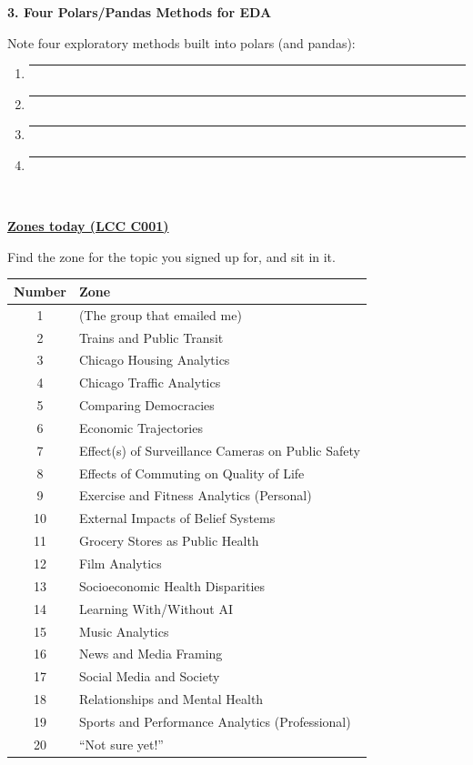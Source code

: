 \documentclass[11pt]{article}
\newcommand{\blankspace}[1]{%
  \vspace{0.3em}
  \begin{minipage}[t][#1][t]{\linewidth}
  \end{minipage}
  \vspace{0.3em}
}
\newcommand{\guidedopen}[4]{%
  \noindent\textbf{#1}\\[0.18em]
  \noindent
  \begin{minipage}[t]{0.485\textwidth}
    #2
    \blankspace{#3}
  \end{minipage}
  \hfill
  \begin{minipage}[t]{0.485\textwidth}
    \blankspace{#4}
  \end{minipage}
  \\[0.4em]
}
\begin{document}
\vfill

\guidedopen{3. Four Polars/Pandas Methods for EDA}{
Note four exploratory methods built into polars (and pandas):
\begin{enumerate}[itemsep=0.2em]
  \item \rule{\linewidth}{0.4pt}%
  \item \rule{\linewidth}{0.4pt}%
  \item \rule{\linewidth}{0.4pt}%
  \item \rule{\linewidth}{0.4pt}%
\end{enumerate}
}{1.2cm}{2.2cm}

\vfill

\newpage

\noindent\underline{\textbf{Zones today (LCC C001)}}
\vspace{0.4em}

Find the zone for the topic you signed up for, and sit in it.
\vspace{0.8em}

{\renewcommand{\arraystretch}{1.25}%
\noindent\begin{tabular}{c l}
\toprule
\textbf{Number} & \textbf{Zone} \\
\midrule
1 & (The group that emailed me) \\
2 & Trains and Public Transit \\
3 & Chicago Housing Analytics \\
4 & Chicago Traffic Analytics \\
5 & Comparing Democracies \\
6 & Economic Trajectories \\
7 & Effect(s) of Surveillance Cameras on Public Safety \\
8 & Effects of Commuting on Quality of Life \\
9 & Exercise and Fitness Analytics (Personal) \\
10 & External Impacts of Belief Systems \\
11 & Grocery Stores as Public Health \\
12 & Film Analytics \\
13 & Socioeconomic Health Disparities \\
14 & Learning With/Without AI \\
15 & Music Analytics \\
16 & News and Media Framing \\
17 & Social Media and Society \\
18 & Relationships and Mental Health \\
19 & Sports and Performance Analytics (Professional) \\
20 & ``Not sure yet!'' \\
\bottomrule
\end{tabular}}
\end{document}
